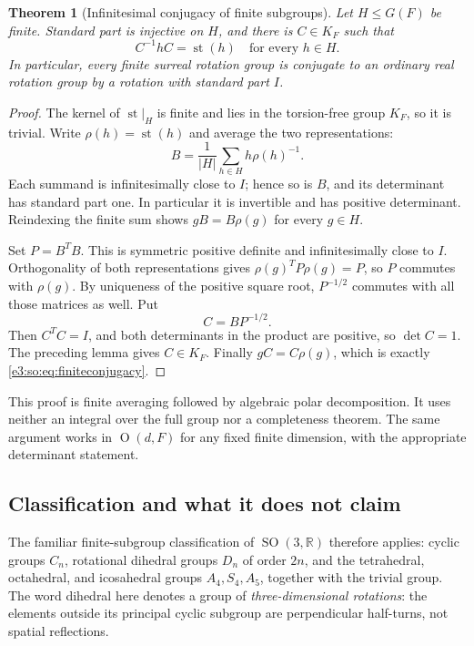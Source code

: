 \documentclass[11pt,letterpaper]{article}
\numberwithin{equation}{section}
\newtheorem{theorem}{Theorem}[section]
\theoremstyle{definition}
\theoremstyle{remark}
\newcommand{\R}{\mathbb R}
\newcommand{\st}{\operatorname{st}}
\newcommand{\SO}{\operatorname{SO}}
\newcommand{\Orth}{\operatorname{O}}
\newcommand{\abs}[1]{\left|#1\right|}
\begin{document}
\begin{theorem}[Infinitesimal conjugacy of finite subgroups]\label{e3:so:thm:finiterigidity}
Let \(H\le G(F)\) be finite. Standard part is injective on \(H\), and there is
\(C\in K_F\) such that
\begin{equation}\label{e3:so:eq:finiteconjugacy}
 C^{-1}hC=\st(h)\quad\text{for every }h\in H.
\end{equation}
In particular, every finite surreal rotation group is conjugate to an ordinary
real rotation group by a rotation with standard part \(I\).
\end{theorem}
\begin{proof}
The kernel of \(\st|_H\) is finite and lies in the torsion-free group \(K_F\),
so it is trivial. Write \(\rho(h)=\st(h)\) and average the two representations:
\begin{equation}\label{e3:so:eq:average}
 B=\frac1{\abs H}\sum_{h\in H}h\rho(h)^{-1}.
\end{equation}
Each summand is infinitesimally close to \(I\); hence so is \(B\), and its
determinant has standard part one. In particular it is invertible and has
positive determinant. Reindexing the finite sum shows
\(gB=B\rho(g)\) for every \(g\in H\).

Set \(P=B^TB\). This is symmetric positive definite and infinitesimally close
to \(I\). Orthogonality of both representations gives
\(\rho(g)^TP\rho(g)=P\), so \(P\) commutes with \(\rho(g)\).
By uniqueness of the positive square root, \(P^{-1/2}\) commutes with all those
matrices as well. Put
\[
 C=BP^{-1/2}.
\]
Then \(C^TC=I\), and both determinants in the product are positive, so
\(\det C=1\). The preceding lemma gives \(C\in K_F\).
Finally \(gC=C\rho(g)\), which is exactly \cref{e3:so:eq:finiteconjugacy}.
\end{proof}

This proof is finite averaging followed by algebraic polar decomposition. It
uses neither an integral over the full group nor a completeness theorem.
The same argument works in \(\Orth(d,F)\) for any fixed finite dimension, with
the appropriate determinant statement.

\subsection{Classification and what it does not claim}

The familiar finite-subgroup classification of \(\SO(3,\R)\) therefore applies:
cyclic groups \(C_n\), rotational dihedral groups \(D_n\) of order \(2n\), and
the tetrahedral, octahedral, and icosahedral groups \(A_4,S_4,A_5\), together
with the trivial group. The word dihedral here denotes a group of
\emph{three-dimensional rotations}: the elements outside its principal cyclic
subgroup are perpendicular half-turns, not spatial reflections.
\end{document}

